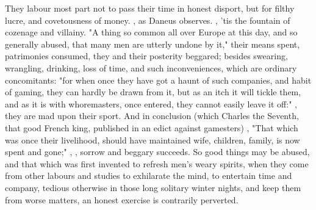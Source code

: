 {They labour most part not to pass their time in honest disport, but for filthy lucre, and covetousness of money. , as Daneus observes. , 'tis the fountain of cozenage and villainy. "A thing so common all over Europe at this day, and so generally abused, that many men are utterly undone by it," their means spent, patrimonies consumed, they and their posterity beggared; besides swearing, wrangling, drinking, loss of time, and such inconveniences, which are ordinary concomitants: "for when once they have got a haunt of such companies, and habit of gaming, they can hardly be drawn from it, but as an itch it will tickle them, and as it is with whoremasters, once entered, they cannot easily leave it off:" , they are mad upon their sport. And in conclusion (which Charles the Seventh, that good French king, published in an edict against gamesters) , \etc{} "That which was once their livelihood, should have maintained wife, children, family, is now spent and gone;" , \etc{}, sorrow and beggary succeeds. So good things may be abused, and that which was first invented to refresh men's weary spirits, when they come from other labours and studies to exhilarate the mind, to entertain time and company, tedious otherwise in those long solitary winter nights, and keep them from worse matters, an honest exercise is contrarily perverted.

}
